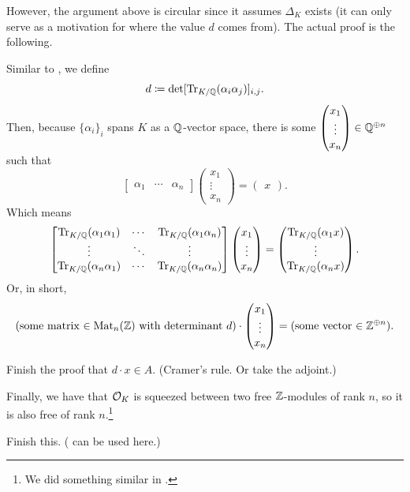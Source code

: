 However, the argument above is circular since it assumes $\Delta_K$ exists (it can only serve as a
motivation for where the value $d$ comes from).
The actual proof is the following.

Similar to , we define
\[ d \coloneqq \det [\operatorname{Tr}_{K/\mathbb Q}(\alpha_i \alpha_j)]_{i, j}. \]
Then, because $\{ \alpha_i \}_{i}$ spans $K$ as a $\mathbb Q$-vector space,
there is some $\begin{pmatrix} x_1 \\ \vdots \\ x_n \end{pmatrix} \in \mathbb Q^{\oplus n}$ such that
\[ \begin{bmatrix} \alpha_1 & \cdots & \alpha_n \end{bmatrix}
\begin{pmatrix} x_1 \\ \vdots \\ x_n \end{pmatrix}
= \begin{pmatrix} x \end{pmatrix}. \]
Which means
\[ \begin{bmatrix}
	\operatorname{Tr}_{K/\mathbb Q}(\alpha_1 \alpha_1) & \cdots & \operatorname{Tr}_{K/\mathbb Q}(\alpha_1 \alpha_n) \\
	\vdots & \ddots & \vdots \\
	\operatorname{Tr}_{K/\mathbb Q}(\alpha_n \alpha_1) & \cdots & \operatorname{Tr}_{K/\mathbb Q}(\alpha_n \alpha_n)
\end{bmatrix}
\begin{pmatrix} x_1 \\ \vdots \\ x_n \end{pmatrix}
= \begin{pmatrix} \operatorname{Tr}_{K/\mathbb Q}(\alpha_1 x) \\ \vdots \\ \operatorname{Tr}_{K/\mathbb Q}(\alpha_n x) \end{pmatrix}. \]
Or, in short,
\[
	(\text{some matrix $\in \mathrm{Mat}_n(\mathbb Z)$ with determinant $d$}) \cdot
	\begin{pmatrix} x_1 \\ \vdots \\ x_n \end{pmatrix}
	= (\text{some vector $\in \mathbb Z^{\oplus n}$}).
\]
\begin{ques}
	Finish the proof that $d \cdot x \in A$.
	(Cramer's rule. Or take the adjoint.)
\end{ques}

Finally, we have that $\mathcal O_K$ is squeezed between two free $\mathbb Z$-modules of rank $n$, so it is
also free of rank $n$.\footnote{We did something similar in .}
\begin{ques}
	Finish this. ( can be used here.)
\end{ques}

